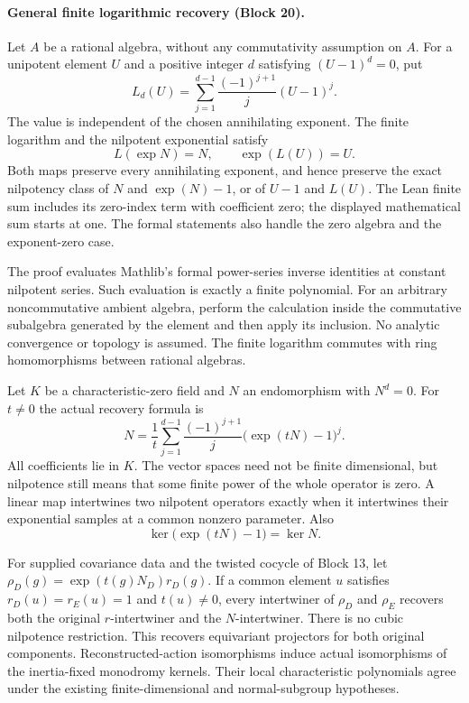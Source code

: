\documentclass[11pt]{article}
\theoremstyle{definition}
\theoremstyle{remark}
\begin{document}
\paragraph{General finite logarithmic recovery (Block 20).}
Let $A$ be a rational algebra, without any commutativity assumption on $A$.
For a unipotent element $U$ and a positive integer $d$ satisfying
$(U-1)^d=0$, put
\[
L_d(U)=\sum_{j=1}^{d-1}\frac{(-1)^{j+1}}{j}(U-1)^j.
\]
The value is independent of the chosen annihilating exponent. The finite
logarithm and the nilpotent exponential satisfy
\[
L(\exp N)=N,\qquad \exp(L(U))=U.
\]
Both maps preserve every annihilating exponent, and hence preserve the
exact nilpotency class of $N$ and $\exp(N)-1$, or of $U-1$ and $L(U)$.
The Lean finite sum includes its zero-index term with coefficient zero;
the displayed mathematical sum starts at one. The formal statements also
handle the zero algebra and the exponent-zero case.

The proof evaluates Mathlib's formal power-series inverse identities at
constant nilpotent series. Such evaluation is exactly a finite polynomial.
For an arbitrary noncommutative ambient algebra, perform the calculation
inside the commutative subalgebra generated by the element and then apply
its inclusion. No analytic convergence or topology is assumed. The
finite logarithm commutes with ring homomorphisms between rational algebras.

Let $K$ be a characteristic-zero field and $N$ an endomorphism with
$N^d=0$. For $t\ne0$ the actual recovery formula is
\[
N=\frac1t\sum_{j=1}^{d-1}\frac{(-1)^{j+1}}{j}
       \bigl(\exp(tN)-1\bigr)^j.
\]
All coefficients lie in $K$. The vector spaces need not be finite
dimensional, but nilpotence still means that some finite power of the
whole operator is zero. A linear map intertwines two nilpotent operators exactly
when it intertwines their exponential samples at a common nonzero
parameter. Also
\[
\ker\bigl(\exp(tN)-1\bigr)=\ker N.
\]

For supplied covariance data and the twisted cocycle of Block 13, let
$\rho_D(g)=\exp(t(g)N_D)r_D(g)$. If a common element $u$ satisfies
$r_D(u)=r_E(u)=1$ and $t(u)\ne0$, every intertwiner of $\rho_D$ and
$\rho_E$ recovers both the original $r$-intertwiner and the $N$-intertwiner.
There is no cubic nilpotence restriction. This recovers equivariant
projectors for both original components. Reconstructed-action isomorphisms
induce actual isomorphisms of the inertia-fixed monodromy kernels. Their local characteristic polynomials
agree under the existing finite-dimensional and normal-subgroup hypotheses.
\end{document}
